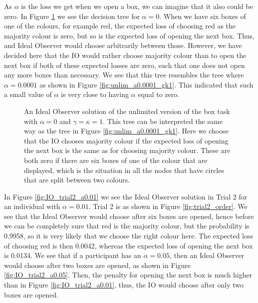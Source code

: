 As $\alpha$ is the loss we get when we open a box, we can imagine that it also could be zero. In Figure \ref{fig:unlim_a0_gk1} we see the decision tree for $\alpha=0$. When we have six boxes of one of the colours, for example red, the expected loss of choosing red as the majority colour is zero, but so is the expected loss of opening the next box. Thus, and Ideal Observer would choose arbitrarily between those. However, we have decided here that the IO would rather choose majority colour than to open the next box if both of these expected losses are zero, such that one does not open any more boxes than necessary. We see that this tree resembles the tree where $\alpha=0.0001$ as shown in Figure \ref{fig:unlim_a0.0001_gk1}. This indicated that such a small value of $\alpha$ is very close to having $\alpha$ equal to zero. 
\begin{figure}
    \centering
    \scalebox{0.5}{}
    \caption[IO solution, unlimited. $\alpha=0$, $\gamma=\kappa=1$]{An Ideal Observer solution of the unlimited version of the box task with $\alpha = 0$ and $\gamma=\kappa=1$. This tree can be interpreted the same way as the tree in Figure \ref{fig:unlim_a0.0001_gk1}.  Here we choose that the IO chooses majority colour if the expected loss of opening the next box is the same as for choosing majority colour. These are both zero if there are six boxes of one of the colour that are displayed, which is the situation in all the nodes that have circles that are split between two colours.}
    \label{fig:unlim_a0_gk1}
\end{figure}

In Figure \ref{fig:IO_trial2_a0.01} we see the Ideal Observer solution in Trial 2 for an individual with $\alpha=0.01$. Trial 2 is as shown in Figure \ref{fig:trial2_order}. We see that the Ideal Observer would choose after six boxes are opened, hence before we can be completely sure that red is the majority colour, but the probability is 0.9958, so it is very likely that we choose the right colour here. The expected loss of choosing red is then 0.0042, whereas the expected loss of opening the next box is 0.0134.
We see that if a participant has an $\alpha=0.05$, then an Ideal Observer would choose after two boxes are opened, as shown in Figure \ref{fig:IO_trial2_a0.05}. Then, the penalty for opening the next box is much higher than in Figure \ref{fig:IO_trial2_a0.01}, thus, the IO would choose after only two boxes are opened. 


